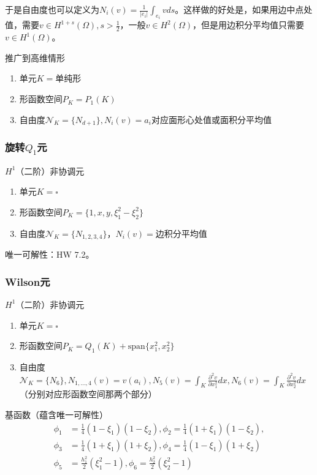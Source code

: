 于是自由度也可以定义为$N_i(v) = \frac{1}{|e_{i}|} \int_{e_{i}} v ds$。这样做的好处是，如果用边中点处值，需要$v \in H^{1 + s}(\Omega), s > \frac{1}{2}$，一般$v \in H^2(\Omega)$，但是用边积分平均值只需要$v \in H^1(\Omega)$。

推广到高维情形

\begin{enumerate}
  \item 单元$K = \text{单纯形}$
  \item 形函数空间$P_K = P_1(K)$
  \item 自由度$\mathcal{N}_K = \{N_{d + 1}\}, N_i(v) = a_i \text{对应面形心处值或面积分平均值}$
\end{enumerate}

\subsubsection{旋转\texorpdfstring{$Q_1$}{TEXT}元}

$H^1$（二阶）非协调元

\begin{enumerate}
  \item 单元$K = \square$
  \item 形函数空间$P_K = \{1, x, y, \xi_1^2 - \xi_2^2\}$
  \item 自由度$\mathcal{N}_K = \{N_{1, 2, 3, 4}\}$，$N_i(v) = \text{边积分平均值}$
\end{enumerate}

唯一可解性：HW 7.2。

\subsubsection{Wilson元}

$H^1$（二阶）非协调元

\begin{enumerate}
  \item 单元$K = \square$
  \item 形函数空间$P_K = Q_1(K) + \text{span}{\{x_1^2, x_2^2\}}$
  \item 自由度$\mathcal{N}_K = \{N_{6}\}, N_{1, \dots, 4}(v) = v(a_i), N_{5}(v)=\int_{K} \frac{\partial^{2} v}{\partial x_{1}^{2}} dx, N_{6}(v)=\int_{K} \frac{\partial^{2} v}{\partial x_{2}^{2}} dx$（分别对应形函数空间那两个部分）
\end{enumerate}

基函数（蕴含唯一可解性）
\[
  \begin{aligned}
    \phi_{1}&=\frac{1}{4}\left(1-\xi_{1}\right)\left(1-\xi_{2}\right), \phi_{2}=\frac{1}{4}\left(1+\xi_{1}\right)\left(1-\xi_{2}\right), \\
    \phi_{3}&=\frac{1}{4}\left(1+\xi_{1}\right)\left(1+\xi_{2}\right), \phi_{4}=\frac{1}{4}\left(1-\xi_{1}\right)\left(1+\xi_{2}\right) \\
    \phi_5 &= \frac{h_1^2}{2}(\xi_{1}^{2}-1), \phi_6 = \frac{h_2^2}{2}(\xi_{2}^{2}-1)
  \end{aligned}
\]

